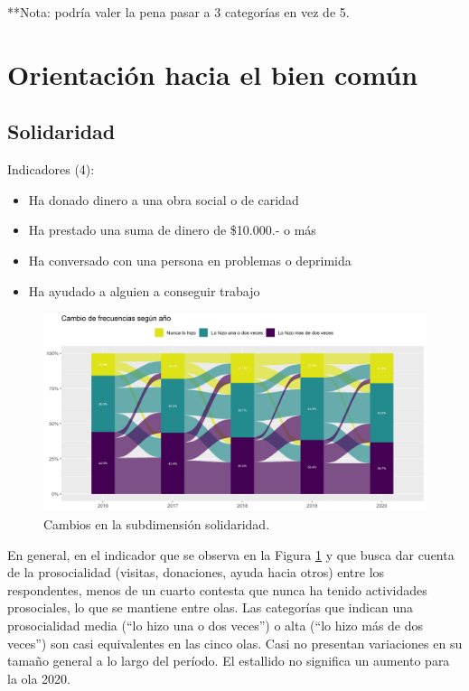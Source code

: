 \documentclass[
  12pt,
]{book}
\begin{document}
**Nota: podría valer la pena pasar a 3 categorías en vez de 5.

\hypertarget{orientaciuxf3n-hacia-el-bien-comuxfan-1}{%
\section{Orientación hacia el bien común}\label{orientaciuxf3n-hacia-el-bien-comuxfan-1}}

\hypertarget{solidaridad}{%
\subsection{Solidaridad}\label{solidaridad}}

Indicadores (4):

\begin{itemize}
\item
  Ha donado dinero a una obra social o de caridad
\item
  Ha prestado una suma de dinero de \$10.000.- o más
\item
  Ha conversado con una persona en problemas o deprimida
\item
  Ha ayudado a alguien a conseguir trabajo
\end{itemize}

\begin{figure}[H]

{\centering \includegraphics[width=1\linewidth,height=1\textheight]{output/graphs/alluvial_solidaridad} 

}

\caption{Cambios en la subdimensión  solidaridad.}\label{fig:alluvial-solidaridad}
\end{figure}

En general, en el indicador que se observa en la Figura \ref{fig:alluvial-solidaridad} y que busca dar cuenta de la prosocialidad (visitas, donaciones, ayuda hacia otros) entre los respondentes, menos de un cuarto contesta que nunca ha tenido actividades prosociales, lo que se mantiene entre olas. Las categorías que indican una prosocialidad media (``lo hizo una o dos veces'') o alta (``lo hizo más de dos veces'') son casi equivalentes en las cinco olas. Casi no presentan variaciones en su tamaño general a lo largo del período. El estallido no significa un aumento para la ola 2020.
\end{document}
